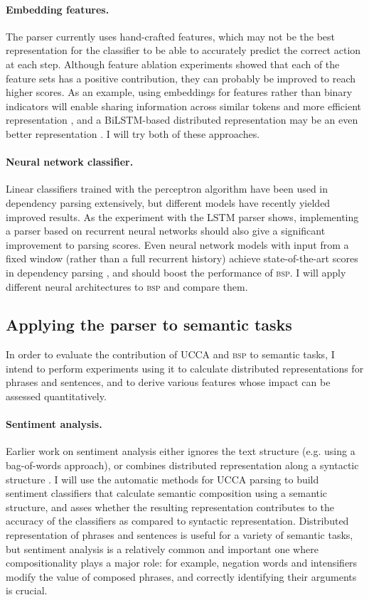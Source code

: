 \documentclass[12pt]{article}
\begin{document}
\paragraph{Embedding features.}
The parser currently uses hand-crafted features, which may not be the best
representation for the classifier to be able to accurately predict the correct action
at each step. Although feature ablation experiments showed that each of the feature
sets has a positive contribution, they can probably be improved to reach higher scores.
As an example, using embeddings for features rather than binary
indicators will enable sharing information across similar tokens and more efficient
representation \cite{chen2014fast},
and a BiLSTM-based distributed representation may be an even better representation
\cite{kiperwasser2016simple}.
I will try both of these approaches.

\paragraph{Neural network classifier.}
Linear classifiers trained with the perceptron algorithm have been used in
dependency parsing extensively, but different models have recently yielded improved
results.
As the experiment with the LSTM parser shows, implementing a parser
based on recurrent neural networks should also give a significant improvement to
parsing scores.
Even neural network models with input from a fixed window (rather than a full recurrent
history) achieve state-of-the-art scores in dependency parsing
\cite{chen2014fast,andor2016globally}, and should boost the performance of \textsc{bsp}.
I will apply different neural architectures to \textsc{bsp} and compare them.

\subsection{Applying the parser to semantic tasks}\label{sec:semantic_tasks}
In order to evaluate the contribution of UCCA and \textsc{bsp} to semantic tasks,
I intend to perform experiments using it to calculate distributed representations for
phrases and sentences, and to derive various features whose impact can be assessed quantitatively.

\paragraph{Sentiment analysis.}
Earlier work on sentiment analysis either ignores the text structure (e.g. using a bag-of-words approach), or
combines distributed representation along a syntactic structure \cite{socher2013recursive}.
I will use the automatic methods for UCCA parsing to build sentiment classifiers that calculate semantic composition
using a semantic structure, and asses whether the resulting representation contributes to the accuracy of the
classifiers as compared to syntactic representation.
Distributed representation of phrases and sentences is useful for a variety of semantic tasks,
but sentiment analysis is a relatively common and important one where compositionality plays a major role:
for example, negation words and intensifiers modify the value of composed phrases, and correctly identifying
their arguments is crucial.
\end{document}
